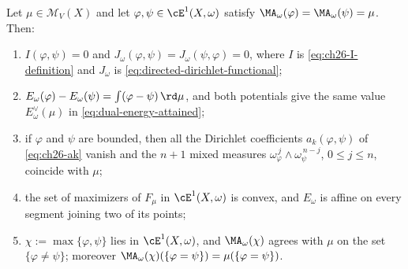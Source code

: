 \begin{proposition}
\label{prop:ch28-solution-set}
Let $\mu\in\mathcal M_V(X)$ and let
$\varphi,\psi\in\cE^1(X,\omega)$ satisfy
$\MA_\omega(\varphi)=\MA_\omega(\psi)=\mu$.  Then:
\begin{enumerate}
\item\label{itm:ch28-sol:I}
 $I(\varphi,\psi)=0$ and $J_\omega(\varphi,\psi)=
 J_\omega(\psi,\varphi)=0$, where $I$ is
 \eqref{eq:ch26-I-definition} and $J_\omega$ is
 \eqref{eq:directed-dirichlet-functional};
\item\label{itm:ch28-sol:energy}
 $E_\omega(\varphi)-E_\omega(\psi)=\int(\varphi-\psi)\,\rd\mu$, and both
 potentials give the same value $E^\vee_\omega(\mu)$ in
 \eqref{eq:dual-energy-attained};
\item\label{itm:ch28-sol:mixed}
 if $\varphi$ and $\psi$ are bounded, then all the Dirichlet
 coefficients $a_k(\varphi,\psi)$ of \eqref{eq:ch26-ak} vanish and the
 $n+1$ mixed measures
 $\omega_\varphi^{\,j}\wedge\omega_\psi^{\,n-j}$, $0\leq j\leq n$,
 coincide with $\mu$;
\item\label{itm:ch28-sol:convex}
 the set of maximizers of $F_\mu$ in $\cE^1(X,\omega)$ is convex, and
 $E_\omega$ is affine on every segment joining two of its points;
\item\label{itm:ch28-sol:max}
 $\chi:=\max\{\varphi,\psi\}$ lies in $\cE^1(X,\omega)$, and
 $\MA_\omega(\chi)$ agrees with $\mu$ on the set
 $\{\varphi\neq\psi\}$; moreover
 $\MA_\omega(\chi)(\{\varphi=\psi\})=\mu(\{\varphi=\psi\})$.
\end{enumerate}
\end{proposition}

